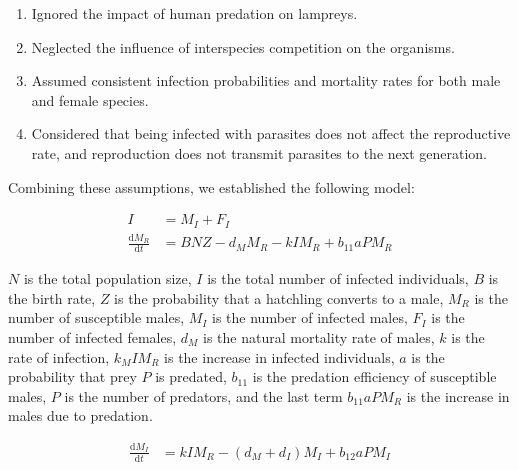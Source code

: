 \documentclass[CTeX = true]{mcmthesis}  %
\begin{document}
\begin{enumerate}
	 \item Ignored the impact of human predation on lampreys. 
     \item Neglected the influence of interspecies competition on the organisms. 
     \item Assumed consistent infection probabilities and mortality rates for both male and female species. 
     \item Considered that being infected with parasites does not affect the reproductive rate, and reproduction does not transmit parasites to the next generation.
\end{enumerate}

Combining these assumptions, we established the following model:

\begin{equation}
\begin{aligned}
I &= M_I+F_I   \\
\frac{\mathrm{d} M_R}{\mathrm{d} t} &= BNZ-d_MM_R-kIM_R+b_{11}aPM_R
\end{aligned}
\end{equation}

$N$ is the total population size, $I$ is the total number of infected individuals, $B$ is the birth rate, $Z$ is the probability that a hatchling converts to a male, $M_R$ is the number of susceptible males, $M_I$ is the number of infected males, $F_I$ is the number of infected females, $d_M$ is the natural mortality rate of males, $k$ is the rate of infection, $k_MIM_R$ is the increase in infected individuals, $a$ is the probability that prey $P$ is predated, $b_{11}$ is the predation efficiency of susceptible males, $P$ is the number of predators, and the last term $b_{11}aPM_R$ is the increase in males due to predation.

\begin{equation}
\begin{aligned}
\frac{\mathrm{d} M_I}{\mathrm{d} t} &= kIM_R-(d_M+d_I)M_I+b_{12}aPM_I 
\end{aligned}
\end{equation}
\end{document}
